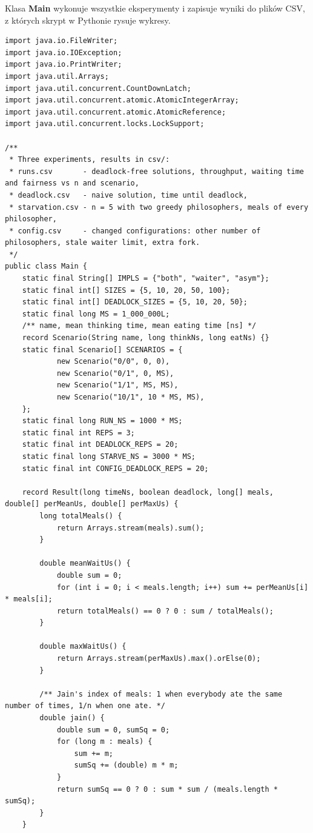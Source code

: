\documentclass[11pt,a4paper]{article}
\begin{document}
Klasa \textbf{Main} wykonuje wszystkie eksperymenty i zapisuje wyniki do plików CSV, z których skrypt w Pythonie rysuje wykresy.

\begin{lstlisting}[caption={Klasa \textbf{Main} (\texttt{src/Main.java})}]
import java.io.FileWriter;
import java.io.IOException;
import java.io.PrintWriter;
import java.util.Arrays;
import java.util.concurrent.CountDownLatch;
import java.util.concurrent.atomic.AtomicIntegerArray;
import java.util.concurrent.atomic.AtomicReference;
import java.util.concurrent.locks.LockSupport;

/**
 * Three experiments, results in csv/:
 * runs.csv       - deadlock-free solutions, throughput, waiting time and fairness vs n and scenario,
 * deadlock.csv   - naive solution, time until deadlock,
 * starvation.csv - n = 5 with two greedy philosophers, meals of every philosopher,
 * config.csv     - changed configurations: other number of philosophers, stale waiter limit, extra fork.
 */
public class Main {
    static final String[] IMPLS = {"both", "waiter", "asym"};
    static final int[] SIZES = {5, 10, 20, 50, 100};
    static final int[] DEADLOCK_SIZES = {5, 10, 20, 50};
    static final long MS = 1_000_000L;
    /** name, mean thinking time, mean eating time [ns] */
    record Scenario(String name, long thinkNs, long eatNs) {}
    static final Scenario[] SCENARIOS = {
            new Scenario("0/0", 0, 0),
            new Scenario("0/1", 0, MS),
            new Scenario("1/1", MS, MS),
            new Scenario("10/1", 10 * MS, MS),
    };
    static final long RUN_NS = 1000 * MS;
    static final int REPS = 3;
    static final int DEADLOCK_REPS = 20;
    static final long STARVE_NS = 3000 * MS;
    static final int CONFIG_DEADLOCK_REPS = 20;

    record Result(long timeNs, boolean deadlock, long[] meals, double[] perMeanUs, double[] perMaxUs) {
        long totalMeals() {
            return Arrays.stream(meals).sum();
        }

        double meanWaitUs() {
            double sum = 0;
            for (int i = 0; i < meals.length; i++) sum += perMeanUs[i] * meals[i];
            return totalMeals() == 0 ? 0 : sum / totalMeals();
        }

        double maxWaitUs() {
            return Arrays.stream(perMaxUs).max().orElse(0);
        }

        /** Jain's index of meals: 1 when everybody ate the same number of times, 1/n when one ate. */
        double jain() {
            double sum = 0, sumSq = 0;
            for (long m : meals) {
                sum += m;
                sumSq += (double) m * m;
            }
            return sumSq == 0 ? 0 : sum * sum / (meals.length * sumSq);
        }
    }


\end{lstlisting}
\end{document}
